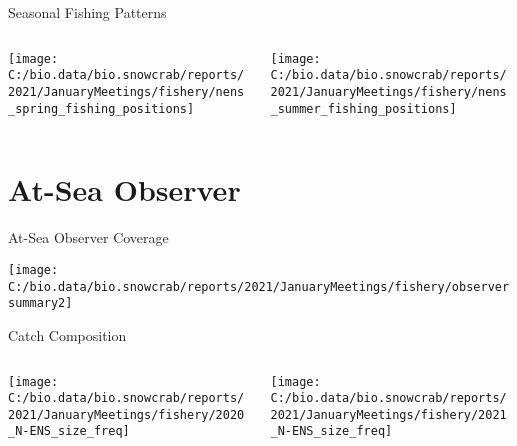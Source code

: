 \documentclass[
  ignorenonframetext,
]{beamer}
\begin{document}
\begin{frame}{Seasonal Fishing Patterns}
\protect\hypertarget{seasonal-fishing-patterns}{}
\begin{columns}[T]
\begin{column}{0.48\textwidth}
\begin{flushleft}\texttt{[image: C:/bio.data/bio.snowcrab/reports/2021/JanuaryMeetings/fishery/nens\_spring\_fishing\_positions]} \end{flushleft}
\end{column}

\begin{column}{0.48\textwidth}
\begin{flushleft}\texttt{[image: C:/bio.data/bio.snowcrab/reports/2021/JanuaryMeetings/fishery/nens\_summer\_fishing\_positions]} \end{flushleft}
\end{column}
\end{columns}
\end{frame}

\hypertarget{at-sea-observer}{%
\section{At-Sea Observer}\label{at-sea-observer}}

\begin{frame}{At-Sea Observer Coverage}
\protect\hypertarget{at-sea-observer-coverage}{}
\begin{center}\texttt{[image: C:/bio.data/bio.snowcrab/reports/2021/JanuaryMeetings/fishery/observersummary2]} \end{center}
\end{frame}

\begin{frame}{Catch Composition}
\protect\hypertarget{catch-composition}{}
\begin{columns}[T]
\begin{column}{0.48\textwidth}
\begin{center}\texttt{[image: C:/bio.data/bio.snowcrab/reports/2021/JanuaryMeetings/fishery/2020\_N-ENS\_size\_freq]} \end{center}
\end{column}

\begin{column}{0.48\textwidth}
\begin{center}\texttt{[image: C:/bio.data/bio.snowcrab/reports/2021/JanuaryMeetings/fishery/2021\_N-ENS\_size\_freq]} \end{center}
\end{column}
\end{columns}
\end{frame}
\end{document}
